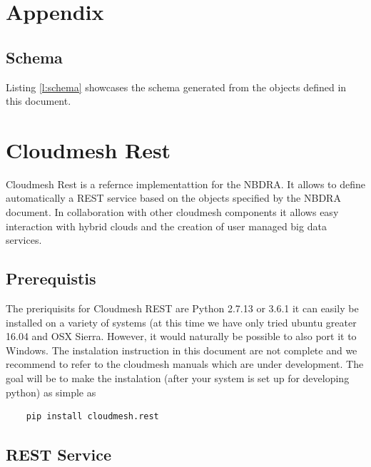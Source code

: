 \documentclass[10pt]{article}
\begin{document}
\newpage


\newpage

\appendix

\section{Appendix}

\subsection{Schema}\label{s:schema}

Listing \ref{l:schema} showcases the schema generated from the objects
defined in this document.


\section{Cloudmesh Rest}\label{s:cloudmesh-rest}

Cloudmesh Rest is a refernce implementattion for the NBDRA. It
allows to define automatically a REST service based on the objects
specified by the NBDRA document. In collaboration with other cloudmesh
components it allows easy interaction with hybrid clouds and the
creation of user managed big data services. 

\subsection{Prerequistis}\label{prerequistis}

The preriquisits for Cloudmesh REST are Python 2.7.13 or 3.6.1
it can easily be installed on a variety of systems (at this time we
have only tried ubuntu greater 16.04 and OSX Sierra. However, it would
naturally be possible to also port it to Windows. The instalation
instruction in this document are not complete and we recommend to
refer to the cloudmesh manuals which are under development. The goal
will be to make the instalation (after your system is set up for
developing python) as simple as 

\begin{verbatim}
    pip install cloudmesh.rest
\end{verbatim}


\subsection{REST Service}\label{cm-rest}
\end{document}

